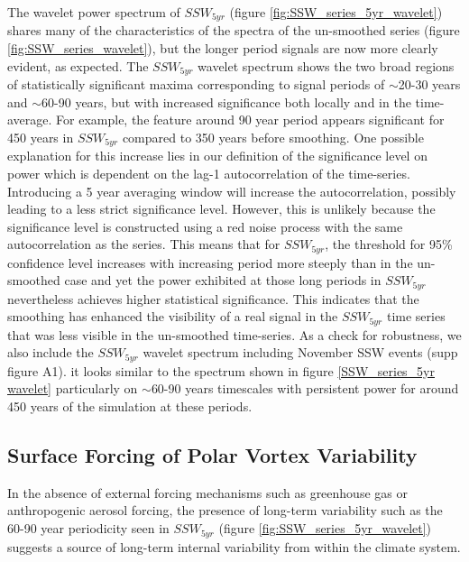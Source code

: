The wavelet power spectrum of $SSW_{5yr}$ (figure \ref{fig:SSW_series_5yr_wavelet}) shares many of the characteristics of the spectra of the un-smoothed series (figure \ref{fig:SSW_series_wavelet}), but the longer period signals are now more clearly evident, as expected. The $SSW_{5yr}$ wavelet spectrum shows the two broad regions of statistically significant maxima corresponding to signal periods of $\sim$20-30 years and $\sim$60-90 years, but with increased significance both locally and in the time-average. For example, the feature around 90 year period appears significant for 450 years in $SSW_{5yr}$ compared to 350 years before smoothing. One possible explanation for this increase lies in our definition of the significance level on power which is dependent on the lag-1 autocorrelation of the time-series. Introducing a 5 year averaging window will increase the autocorrelation, possibly leading to a less strict significance level. However, this is unlikely because the significance level is constructed using a red noise process with the same autocorrelation as the series. This means that for $SSW_{5yr}$, the threshold for 95\% confidence level increases with increasing period more steeply than in the un-smoothed case and yet the power exhibited at those long periods in $SSW_{5yr}$ nevertheless achieves higher statistical significance. This indicates that the smoothing has enhanced the visibility of a real signal in the $SSW_{5yr}$ time series that was less visible in the un-smoothed time-series. As a check for robustness, we also include the $SSW_{5yr}$ wavelet spectrum including November SSW events (supp figure A1). it looks similar to  the spectrum shown in figure \ref{SSW_series_5yr wavelet} particularly on $\sim$60-90 years timescales with persistent power for around 450 years of the simulation at these periods.

\subsection{Surface Forcing of Polar Vortex Variability}
In the absence of external forcing mechanisms such as greenhouse gas or anthropogenic aerosol forcing, the presence of long-term variability such as the 60-90 year periodicity seen in $SSW_{5yr}$ (figure \ref{fig:SSW_series_5yr_wavelet}) suggests a source of long-term internal variability from within the climate system. 

